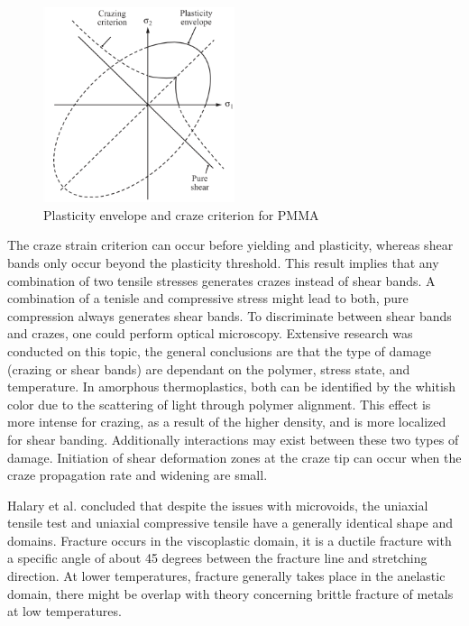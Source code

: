 \begin{figure}[htb]
    \centering
    \includegraphics[width=0.5\textwidth]{chapter_2/figures/crazecrit.png}
    \caption{Plasticity envelope and craze criterion for PMMA \cite{Halary2011PolymerMaterials}}
    \label{fig:crazecrit}
\end{figure}

The craze strain criterion can occur before yielding and plasticity, whereas shear bands only occur beyond the plasticity threshold. This result implies that any combination of two tensile stresses generates crazes instead of shear bands. A combination of a tenisle and compressive stress might lead to both, pure compression always generates shear bands.
To discriminate between shear bands and crazes, one could perform optical microscopy. Extensive research was conducted on this topic, the general conclusions are that the type of damage (crazing or shear bands) are dependant on the polymer, stress state, and temperature. In amorphous thermoplastics, both can be identified by the whitish color due to the scattering of light through polymer alignment. This effect is more intense for crazing, as a result of the higher density, and is more localized for shear banding.
Additionally interactions may exist between these two types of damage. Initiation of shear deformation zones at the craze tip can occur when the craze propagation rate and widening are small. 

Halary et al. concluded that despite the issues with microvoids, the uniaxial tensile test and uniaxial compressive tensile have a generally identical shape and domains. Fracture occurs in the viscoplastic domain, it is a ductile fracture with a specific angle of about 45 degrees between the fracture line and stretching direction. At lower temperatures, fracture generally takes place in the anelastic domain, there might be overlap with theory concerning brittle fracture of metals at low temperatures.  

